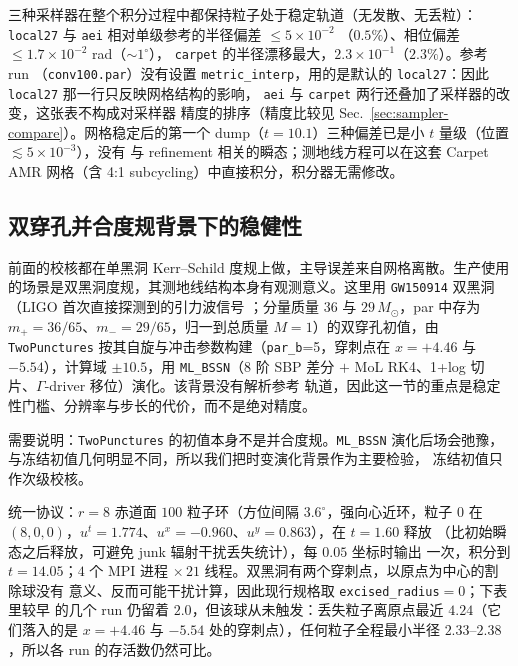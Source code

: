 \documentclass[11pt,UTF8]{ctexart}
\begin{document}
三种采样器在整个积分过程中都保持粒子处于稳定轨道（无发散、无丢粒）：
\texttt{local27} 与 \texttt{aei} 相对单级参考的半径偏差 $\le5\times10^{-2}$
（$0.5\%$）、相位偏差 $\le1.7\times10^{-2}$ rad（$\sim1^\circ$），
\texttt{carpet} 的半径漂移最大，$2.3\times10^{-1}$（$2.3\%$）。参考 run
（\texttt{conv100.par}）没有设置 \texttt{metric\_interp}，用的是默认的
\texttt{local27}：因此 \texttt{local27} 那一行只反映网格结构的影响，
\texttt{aei} 与 \texttt{carpet} 两行还叠加了采样器的改变，这张表不构成对采样器
精度的排序（精度比较见 Sec.~\ref{sec:sampler-compare}）。网格稳定后的第一个
dump（$t=10.1$）三种偏差已是小 $t$ 量级（位置 $\lesssim5\times10^{-3}$），没有
与 refinement 相关的瞬态；测地线方程可以在这套 Carpet AMR 网格（含 4:1
subcycling）中直接积分，积分器无需修改。

\subsection{双穿孔并合度规背景下的稳健性}\label{sec:gw150914}

前面的校核都在单黑洞 Kerr--Schild 度规上做，主导误差来自网格离散。生产使用
的场景是双黑洞度规，其测地线结构本身有观测意义\citep{chernov2024}。这里用
\texttt{GW150914} 双黑洞（LIGO 首次直接探测到的引力波信号
\citep{abbott2016gw150914}；分量质量 $36$ 与 $29\,M_\odot$，par 中存为
$m_+=36/65$、$m_-=29/65$，归一到总质量 $M=1$）的双穿孔初值，由
\texttt{TwoPunctures} 按其自旋与冲击参数构建（\texttt{par\_b}=5，穿刺点在
$x=+4.46$ 与 $-5.54$），计算域 $\pm10.5$，用 \texttt{ML\_BSSN}（8 阶 SBP
差分 $+$ MoL RK4、1+log 切片、$\Gamma$-driver 移位）演化。该背景没有解析参考
轨道，因此这一节的重点是稳定性门槛、分辨率与步长的代价，而不是绝对精度。

需要说明：\texttt{TwoPunctures} 的初值本身不是并合度规。\texttt{ML\_BSSN}
演化后场会弛豫，与冻结初值几何明显不同，所以我们把时变演化背景作为主要检验，
冻结初值只作次级校核。

统一协议：$r=8$ 赤道面 $100$ 粒子环（方位间隔 $3.6^\circ$，强向心近环，粒子
0 在 $(8,0,0)$，$u^t=1.774$、$u^x=-0.960$、$u^y=0.863$），在 $t=1.60$ 释放
（比初始瞬态之后释放，可避免 junk 辐射干扰丢失统计），每 $0.05$ 坐标时输出
一次，积分到 $t=14.05$；$4$ 个 MPI 进程 $\times\,21$ 线程。双黑洞有两个穿刺点，以原点为中心的割除球没有
意义、反而可能干扰计算，因此现行规格取 \texttt{excised\_radius}$=0$；下表里较早
的几个 run 仍留着 $2.0$，但该球从未触发：丢失粒子离原点最近 $4.24$（它们落入的是
$x=+4.46$ 与 $-5.54$ 处的穿刺点），任何粒子全程最小半径 $2.33$--$2.38$，所以各
run 的存活数仍然可比。
\end{document}
